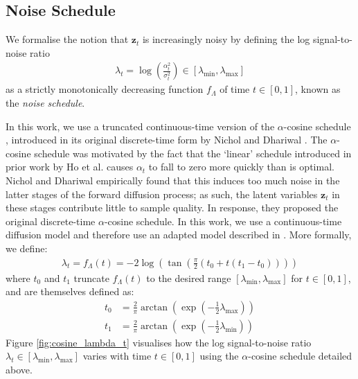 \documentclass[ oneside,%
                    author={George Herbert},
                    degree={MSci},
                     title={Diffusion Models for Time-Evolving Precipitation Fields},
                  subtitle={}]{dissertation}
\begin{document}
\subsection{Noise Schedule}
\label{sec:background_diffusion_noise_schedule}

We formalise the notion that $\mathbf{z}_t$ is increasingly noisy by defining the log signal-to-noise ratio
\begin{align}
      \lambda_t = \log\left( \frac{\alpha_t^2}{\sigma_t^2}\right)\in[\lambda_{\min}, \lambda_{\max}]
\end{align}
as a strictly monotonically decreasing function $f_{\Lambda}$ of time $t\in[0, 1]$, known as the \textit{noise schedule}.

In this work, we use a truncated continuous-time version of the $\alpha$-cosine schedule \cite{IDDPM_Nichol}, introduced in its original discrete-time form by Nichol and Dhariwal \cite{IDDPM_Nichol}. The $\alpha$-cosine schedule was motivated by the fact that the `linear' schedule introduced in prior work by Ho et al. \cite{DDPM_Ho} causes $\alpha_t$ to fall to zero more quickly than is optimal. Nichol and Dhariwal empirically found that this induces too much noise in the latter stages of the forward diffusion process; as such, the latent variables $\mathbf{z}_t$ in these stages contribute little to sample quality. In response, they proposed the original discrete-time $\alpha$-cosine schedule. In this work, we use a continuous-time diffusion model and therefore use an adapted model described in \cite{Simple_Diffusion_Hoogeboom}. More formally, we define:
\begin{align}
      \lambda_t=f_{\Lambda}(t)=-2\log\left(\tan\left(\frac{\pi}{2}(t_0+t(t_1-t_0))\right)\right)
      \label{eq:f_lambda_alpha_cosine}
\end{align} 
where $t_0$ and $t_1$ truncate $f_{\Lambda}(t)$ to the desired range $[\lambda_{\min}, \lambda_{\max}]$ for $t\in[0,1]$, and are themselves defined as:
\begin{align}
      t_0&=\frac{2}{\pi}\arctan\left(\exp\left(-\frac{1}{2}\lambda_{\max}\right)\right)\\
      t_1&=\frac{2}{\pi}\arctan\left(\exp\left(-\frac{1}{2}\lambda_{\min}\right)\right)
\end{align}
Figure \ref{fig:cosine_lambda_t} visualises how the log signal-to-noise ratio $\lambda_t\in[\lambda_{\min},\lambda_{\max}]$ varies with time $t\in[0,1]$ using the $\alpha$-cosine schedule detailed above.
\end{document}
